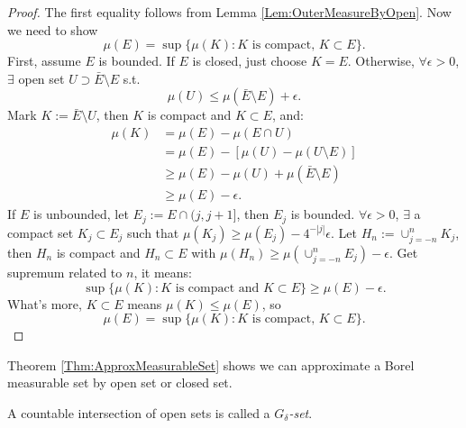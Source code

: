 \begin{proof}
    The first equality follows from Lemma \ref{Lem:OuterMeasureByOpen}. 
    Now we need to show 
    \begin{displaymath}
        \mu(E)=\sup\{\mu(K):K\text{ is compact, }K\subset E\}.
    \end{displaymath}
    First, assume $E$ is bounded. If $E$ is closed, just choose $K=E$. 
    Otherwise, $\forall\epsilon>0$, $\exists$ open set 
    $U\supset\bar{E}\setminus E$ s.t. 
    \begin{displaymath}
        \mu(U)\le\mu(\bar{E}\setminus E)+\epsilon.
    \end{displaymath}
    Mark $K:=\bar{E}\setminus U$, then $K$ is compact and $K\subset E$, 
    and:
    \begin{displaymath}
        \begin{array}{rl}
            \mu(K)&=\mu(E)-\mu(E\cap U)\\
            &=\mu(E)-[\mu(U)-\mu(U\setminus E)]\\
            &\ge\mu(E)-\mu(U)+\mu(\bar{E}\setminus E)\\
            &\ge\mu(E)-\epsilon.
        \end{array}
    \end{displaymath}
    If $E$ is unbounded, let $E_j:=E\cap (j,j+1]$, then 
    $E_{j}$ is bounded. $\forall\epsilon>0$, $\exists$ a compact 
    set $K_j\subset E_j$ such that 
    $\mu(K_j)\ge\mu(E_j)-4^{-|j|}\epsilon$. 
    Let $H_{n}:=\cup_{j=-n}^{n}K_j$, then $H_n$ is compact and 
    $H_n\subset E$ with $\mu(H_n)\ge\mu(\cup_{j=-n}^{n}E_j)-\epsilon$. 
    Get supremum related to $n$, 
    it means:
    \begin{displaymath}
        \sup\{\mu(K):K\text{ is compact and }K\subset E\}
        \ge\mu(E)-\epsilon.
    \end{displaymath}
    What's more, $K\subset E$ means $\mu(K)\le\mu(E)$, so 
    \begin{displaymath}
        \mu(E)=\sup\{\mu(K):K\text{ is compact, }K\subset E\}.
    \end{displaymath}
\end{proof}
\begin{rem}
    Theorem \ref{Thm:ApproxMeasurableSet} shows we can 
    approximate a Borel measurable set by 
    open set or closed set.
\end{rem}
\begin{defn}
    A countable intersection of open sets is called a 
    \textit{$G_{\delta}$-set}.
\end{defn}
